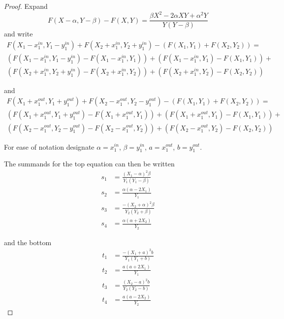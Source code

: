 \documentclass{article}
\theoremstyle{case}
\begin{document}
\begin{proof}
Expand 
\[
F(X - \alpha, Y - \beta) - F(X, Y) = \frac{\beta X^2 - 2\alpha XY + \alpha^2 Y}{Y\left( Y-\beta\right)}
\]
and write
\begin{align*}
F(X_1 - x_1^{in}, Y_1 - y_1^{in}) + F(X_2 + x_1^{in}, Y_2 + y_1^{in}) - \left( F(X_1, Y_1) + F(X_2, Y_2)\right) = \\
\left( F(X_1 - x_1^{in}, Y_1 - y_1^{in}) - F(X_1 - x_1^{in}, Y_1)\right) + \left( F(X_1 - x_1^{in}, Y_1) - F(X_1 , Y_1)\right) + \\
\left( F(X_2 + x_1^{in}, Y_2 + y_1^{in}) - F(X_2 + x_1^{in}, Y_2)\right) + \left( F(X_2 + x_1^{in}, Y_2) - F(X_2, Y_2)\right)
\end{align*}

and
\begin{align*}
F(X_1 + x_1^{out}, Y_1 + y_1^{out}) + F(X_2 - x_1^{out}, Y_2 - y_1^{out}) - \left( F(X_1, Y_1) + F(X_2, Y_2)\right) = \\
\left( F(X_1 + x_1^{out}, Y_1 + y_1^{out}) - F(X_1 + x_1^{out}, Y_1)\right) + \left( F(X_1 + x_1^{out}, Y_1) - F(X_1 , Y_1)\right) + \\
\left( F(X_2 - x_1^{out}, Y_2 - y_1^{out}) - F(X_2 - x_1^{out}, Y_2)\right) + \left( F(X_2 - x_1^{out}, Y_2) - F(X_2, Y_2)\right)
\end{align*}

For ease of notation designate $\alpha = x_1^{in}$, $\beta = y_1^{in}$, $a = x_1^{out}$, $b = y_1^{out}$.

The summands for the top equation can then be written
\begin{align*}
s_1 & = \frac{\left(X_1 - \alpha\right)^2\beta}{Y_1\left( Y_1 - \beta\right)} \\
s_2 & = \frac{\alpha \left( \alpha - 2X_1\right)}{Y_1} \\
s_3 & = \frac{-\left( X_2 + \alpha\right)^2\beta}{Y_2\left( Y_2 + \beta\right)} \\
s_4 & = \frac{\alpha\left( \alpha + 2X_2\right)}{Y_2}
\end{align*}

and the bottom
\begin{align*}
t_1 & = \frac{-\left( X_1 + a\right)^2 b}{Y_1\left( Y_1 + b\right)} \\
t_2 & = \frac{a\left( a + 2X_1\right)}{Y_1} \\
t_3 & = \frac{\left( X_2 - a\right)^2b}{Y_2\left( Y_2 - b\right)} \\
t_4 & = \frac{a\left( a - 2X_2\right)}{Y_2}
\end{align*}


\end{proof}
\end{document}
